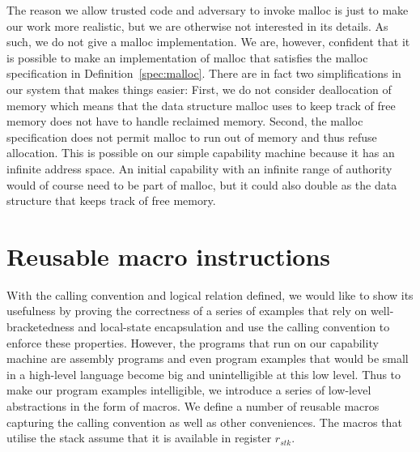 \documentclass[format=acmsmall, review=true, screen=true]{acmart}
\newcommand{\var}[1]{\mathit{#1}}
\newcommand{\stk}{\var{stk}}
\newenvironment{toplas}{}{}
\newcommand{\itoplassug}[1]{}
\begin{document}
\begin{toplas}
The reason we allow trusted code and adversary to invoke malloc is just to make
our work more realistic, but we are otherwise not interested in its details. As
such, we do not give a malloc implementation. We are, however, confident that it
is possible to make an implementation of malloc that satisfies the malloc
specification in Definition~\ref{spec:malloc}. There are in fact two
simplifications in our system that makes things easier: First, we do not consider
deallocation of memory which means that the data structure malloc uses to keep
track of free memory does not have to handle reclaimed memory. Second, the
malloc specification does not permit malloc to run out of memory and thus refuse
allocation. This is possible on our simple capability machine because it has an
infinite address space. An initial capability with an infinite range of
authority would of course need to be part of malloc, but it could also double as
the data structure that keeps track of free memory. %

\section{Reusable macro instructions}
\label{sec:macros}
With the calling convention and logical relation defined, we would like to show its usefulness by proving
the correctness of a series of examples that rely
on well-bracketedness and local-state encapsulation and use the calling
convention to enforce these properties. However, the programs that
run on our capability machine are assembly programs and even program examples that would
be small in a high-level language become big and unintelligible at this
low level. Thus to make our program examples intelligible, we introduce a
series of low-level abstractions in the form of macros.
We define a number of reusable macros capturing the calling convention as well
as other conveniences. The macros that utilise the stack assume that it is
available in register $r_\stk$.
\itoplassug{Lau, suggestion: should we mention temporary registers? They are
  used in the macros, but it seems like a minor technical detail.}


\end{toplas}
\end{document}
